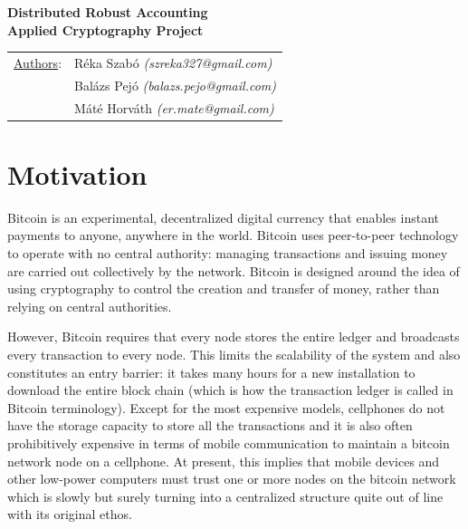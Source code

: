 \documentclass[a4paper,12pt]{article}
\begin{document}
\pagestyle{fancy}
\rhead{}
\begin{center}
\LARGE{\textbf{Distributed Robust Accounting}}\\
\vspace{0.5cm}
\textbf{\large{Applied Cryptography Project}}\\
\vspace{0.5cm}
\end{center}
\begin{tabular}{p{2cm}l}
\underline{Authors}:&Réka Szabó \textit{(szreka327@gmail.com)}\\
&Balázs Pejó \textit{(balazs.pejo@gmail.com)}\\
&Máté Horváth \textit{(er.mate@gmail.com)}
\end{tabular}
\vspace{0.5cm}
\section{Motivation}
Bitcoin is an experimental, decentralized digital currency that enables instant payments to anyone, anywhere in the world. Bitcoin uses peer-to-peer technology to operate with no central authority: managing transactions and issuing money are carried out collectively by the network. Bitcoin is designed around the idea of using cryptography to control the creation and transfer of money, rather than relying on central authorities.

However, Bitcoin requires that every node stores the entire ledger and broadcasts every transaction to every node. This limits the scalability of the system and also constitutes an entry barrier: it takes many hours for a new installation to download the entire block chain (which is how the transaction ledger is called in Bitcoin terminology). Except for the most expensive models, cellphones do not have the storage capacity to store all the transactions and it is also often prohibitively expensive in terms of mobile communication to maintain a bitcoin network node on a cellphone. At present, this implies that mobile devices and other low-power computers must trust one or more nodes
on the bitcoin network which is slowly but surely turning into a centralized structure quite out of line with its original ethos.
\end{document}
